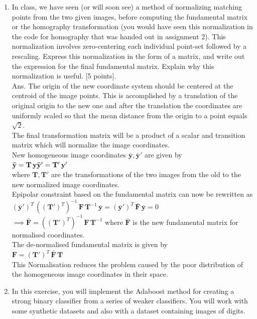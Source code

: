 \documentclass[11pt]{article}
\begin{document}
\begin{enumerate}
\item In class, we have seen (or will soon see) a method of normalizing matching points from the two given images, before computing the fundamental matrix or the homography transformation (you would have seen this normalization in the code for homography that was handed out in assignment 2). This normalization involves zero-centering each individual point-set followed by a rescaling. Express this normalization in the form of a matrix, and write out the expression for the final fundamental matrix. Explain why this normalization is useful. \textsf{[5 points]}.\\
Ans. The origin of the new coordinate system should be centered at the centroid of the image points. This is accomplished by a translation of the original origin to the new one and after the translation the coordinates are uniformly scaled so that the mean distance from the origin to a point equals  $\sqrt{2}$.\\
The final transformation matrix will be a product of  a scalar and transition matrix which will normalize the image coordinates.\\
New homogeneous image coordinates  $\mathbf{\bar y}, \mathbf{\bar y}'$  are given by\\
 $\mathbf{\bar y} = \mathbf{T} \, \mathbf{y}\\ 
 \mathbf{\bar y}' = \mathbf{T}' \, \mathbf{y}'$ \\
 where  $\mathbf{T}, \mathbf{T}'$  are the transformations of the two images from the old to the new normalized image coordinates.\\
 Epipolar constraint based on the fundamental matrix can now be rewritten as\\
$(\mathbf{\bar y}')^{T} \, ((\mathbf{T}')^{T})^{-1} \, \mathbf{F} \, \mathbf{T}^{-1}\, \mathbf{\bar y} = (\mathbf{\bar y}')^{T} \, \mathbf{\bar F} \, \mathbf{\bar y} = 0$\\
$\implies \mathbf{\bar F} = ((\mathbf{T}')^{T})^{-1} \, \mathbf{F} \, \mathbf{T}^{-1}$ where $\mathbf{\bar F}$ is the new fundamental matrix for normalised coordinates.\\
The de-normalised fundamental matrix is given by\\
$ \mathbf{F} = (\mathbf{T}')^{T} \, \mathbf{\bar F} \, \mathbf{T} $\\
This Normalisation reduces the problem caused by the poor distribution of the homogeneous image coordinates in their space.
\item In this exercise, you will implement the Adaboost method for creating a strong binary classifier from a series of weaker classifiers. You will work with some synthetic datasets and also with a dataset containing images of digits.

\end{enumerate}
\end{document}
